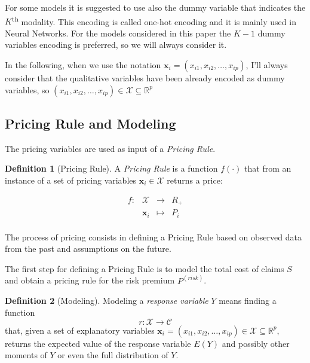 \documentclass[a4paper, nobind]{templates/ociamthesis}
\theoremstyle{definition}
\newtheorem{definition}{Definition}[chapter]
\theoremstyle{definition}
\theoremstyle{definition}
\theoremstyle{remark}
\begin{document}
For some models it is suggested to use also the dummy variable that indicates the \(K\)\textsuperscript{th} modality. This encoding is called one-hot encoding and it is mainly used in Neural Networks. For the models considered in this paper the \(K-1\) dummy variables encoding is preferred, so we will always consider it.

In the following, when we use the notation \(\boldsymbol{x}_i=(x_{i1}, x_{i2}, \dots, x_{ip})\), I'll always consider that the qualitative variables have been already encoded as dummy variables, so \((x_{i1}, x_{i2}, \dots, x_{ip})\in \mathcal{X} \subseteq \mathbb{R}^p\)

\hypertarget{pricing-rule-and-modeling}{%
\subsection{Pricing Rule and Modeling}\label{pricing-rule-and-modeling}}

The pricing variables are used as input of a \emph{Pricing Rule}.

\begin{definition}[Pricing Rule]
\label{def:pricing-rule} \iffalse (Pricing Rule) \fi{} A \emph{Pricing Rule} is a function \(f(\cdot)\) that from an instance of a set of pricing variables \(\boldsymbol{x}_i\in\mathcal{X}\) returns a price:

\[  
\begin{array}{rccl}
f: & \mathcal{X}      & \longrightarrow  & R_+ \\
   & \boldsymbol{x}_i & \longmapsto      & P_i \\
\end{array}
\]
\end{definition}

The process of pricing consists in defining a Pricing Rule based on observed data from the past and assumptions on the future.

The first step for defining a Pricing Rule is to model the total cost of claims \(S\) and obtain a pricing rule for the risk premium \(P^{(risk)}\).

\begin{definition}[Modeling]
\label{def:modeling} \iffalse (Modeling) \fi{} Modeling a \emph{response variable} \(Y\) means finding a function
\[r:\mathcal{X}\rightarrow \mathcal{C}\]
that, given a set of explanatory variables \(\boldsymbol{x}_i=(x_{i1}, x_{i2}, \dots, x_{ip})\in \mathcal{X} \subseteq \mathbb{R}^p\), returns the expected value of the response variable \(E(Y)\) and possibly other moments of \(Y\) or even the full distribution of \(Y\).
\end{definition}
\end{document}
